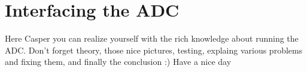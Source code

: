 \chapter{Interfacing the ADC}
Here Casper you can realize yourself with the rich knowledge about running the ADC.
Don't forget theory, those nice pictures, testing, explaing various problems and fixing them, and finally the conclusion :) Have a nice day